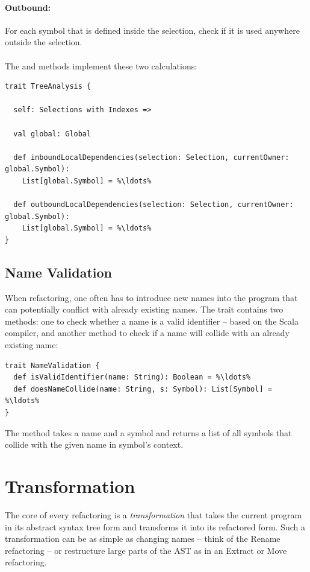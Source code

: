 \paragraph{Outbound:} For each symbol that is defined inside the selection, check if it is used anywhere outside the selection.
\\\\
The  and  methods implement these two calculations:

\begin{lstlisting}
trait TreeAnalysis {
  
  self: Selections with Indexes =>
  
  val global: Global
  
  def inboundLocalDependencies(selection: Selection, currentOwner: global.Symbol): 
    List[global.Symbol] = %\ldots%
  
  def outboundLocalDependencies(selection: Selection, currentOwner: global.Symbol): 
    List[global.Symbol] = %\ldots%
}
\end{lstlisting}

\subsection{Name Validation}

When refactoring, one often has to introduce new names into the program that can potentially conflict with already existing names. The  trait contains two methods: one to check whether a name is a valid identifier -- based on the Scala compiler, and another method to check if a name will collide with an already existing name:

\begin{lstlisting}
trait NameValidation {
  def isValidIdentifier(name: String): Boolean = %\ldots%
  def doesNameCollide(name: String, s: Symbol): List[Symbol] = %\ldots%
}
\end{lstlisting}

The  method takes a name and a symbol and returns a list of all symbols that collide with the given name in symbol's context.

\newpage
\section{Transformation} \label{section:transformation}

The core of every refactoring is a \textit{transformation} that takes the current program in its abstract syntax tree form and transforms it into its refactored form. Such a transformation can be as simple as changing names -- think of the Rename refactoring -- or restructure large parts of the AST as in an Extract or Move refactoring. 

